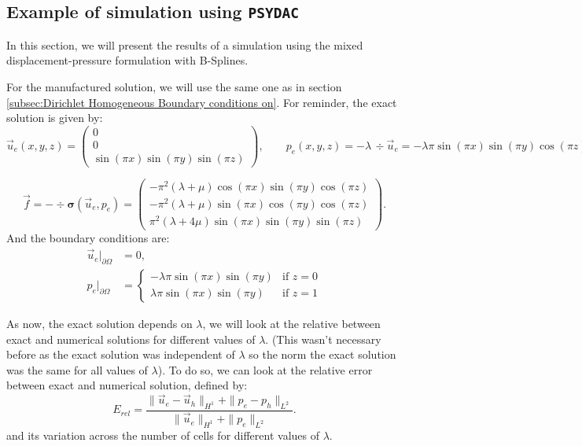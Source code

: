 \documentclass[a4paper,12pt,twoside]{report}
\begin{document}
\subsection{Example of simulation using \texttt{PSYDAC}}
In this section, we will present the results of a simulation using the mixed displacement-pressure formulation with B-Splines. 

For the manufactured solution, we will use the same one as in section \ref{subsec:Dirichlet Homogeneous Boundary conditions on}. For reminder, the exact solution is given by:
$$
\vec u_e(x,y,z)=
\begin{pmatrix}
0\\[2pt]
0\\[2pt]
\sin(\pi x)\sin(\pi y)\sin(\pi z)
\end{pmatrix},\qquad
p_e(x,y,z)= -\lambda\,\div \vec u_e = -\lambda \pi \sin(\pi x)\sin(\pi y)\cos(\pi z).
$$

$$
\vec f = -\div \boldsymbol\sigma(\vec u_e,p_e)=
\begin{pmatrix}
-\pi^{2}(\lambda+\mu)\cos(\pi x)\sin(\pi y)\cos(\pi z)\\[4pt]
-\pi^{2}(\lambda+\mu)\sin(\pi x)\cos(\pi y)\cos(\pi z)\\[4pt]
\pi^{2}(\lambda+4\mu)\sin(\pi x)\sin(\pi y)\sin(\pi z)
\end{pmatrix}.
$$
And the boundary conditions are: 
\begin{align*}
\vec u_e|_{\partial\Omega} &= 0,\\
p_e|_{\partial\Omega} &= \begin{cases}
-\lambda \pi \sin(\pi x) \sin(\pi y) & \text{if } z = 0 \\
\lambda \pi \sin(\pi x) \sin(\pi y) & \text{if } z = 1
\end{cases}
\end{align*}

As now, the exact solution depends on $\lambda$, we will look at the relative between exact and numerical solutions for different values of $\lambda$. (This wasn't necessary before as the exact solution was independent of $\lambda$ so the norm the exact solution was the same for all values of $\lambda$).
To do so, we can look at the relative error between exact and numerical solution, defined by: 
$$
E_{rel} = \frac{\|\vec u_e - \vec u_h\|_{H^1} + \|p_e - p_h\|_{L^2}}{\|\vec u_e\|_{H^1} + \|p_e\|_{L^2}}.
$$
and its variation across the number of cells for different values of $\lambda$.
\end{document}
